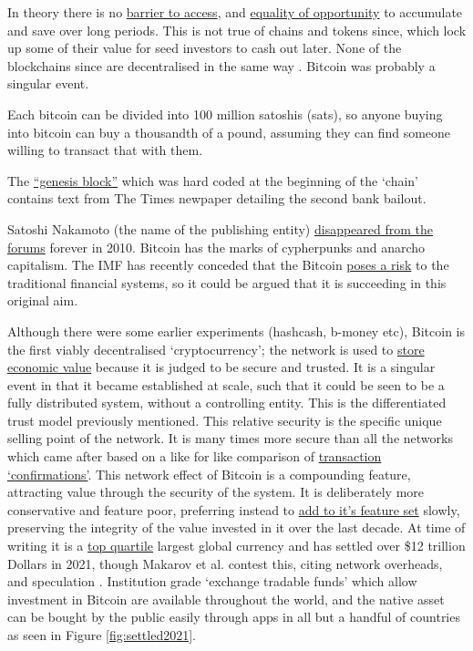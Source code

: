 In theory there is no \href{https://www.forbes.com/sites/peterizzo/2021/09/29/against-cryptocurrency-the-ethical-argument-for-bitcoin-maximalism/?}{barrier to access}, and \href{https://www.coindesk.com/layer2/2022/02/16/why-bitcoin-is-a-tool-for-social-justice/}{equality of opportunity} to accumulate and save over long periods. This is not true of chains and tokens since, which lock up some of their value for seed investors to cash out later. None of the blockchains since are decentralised in the same way \cite{selvam2021blockchain}. Bitcoin was probably a singular event.\par
Each bitcoin can be divided into 100 million satoshis (sats), so anyone buying into bitcoin can buy a thousandth of a pound, assuming they can find someone willing to transact that with them. \par
The \href{https://en.bitcoin.it/wiki/Genesis_block}{``genesis block''} which was hard coded at the beginning of the `chain' contains text from The Times newpaper detailing the second bank bailout.\par 
Satoshi Nakamoto (the name of the publishing entity) \href{https://bitcoinmagazine.com/technical/what-happened-when-bitcoin-creator-satoshi-nakamoto-disappeared}{disappeared from the forums} forever in 2010. Bitcoin has the marks of cypherpunks and anarcho capitalism. The IMF has recently conceded that the Bitcoin \href{https://blogs.imf.org/2022/01/11/crypto-prices-move-more-in-sync-with-stocks-posing-new-risks/}{poses a risk} to the traditional financial systems, so it could be argued that it is succeeding in this original aim.\par
Although there were some earlier experiments (hashcash, b-money etc), Bitcoin is the first viably decentralised `cryptocurrency'; the network is used to \href{https://www.aier.org/article/why-does-bitcoin-have-value/}{store economic value} because it is judged to be secure and trusted. It is a singular event in that it became established at scale, such that it could be seen to be a fully distributed system, without a controlling entity. This is the differentiated trust model previously mentioned. This relative security is the specific unique selling point of the network. It is many times more secure than all the networks which came after based on a like for like comparison of \href{https://howmanyconfs.com/}{transaction `confirmations'}. This network effect of Bitcoin is a compounding feature, attracting value through the security of the system. It is deliberately more conservative and feature poor, preferring instead to \href{https://bips.xyz/}{add to it's feature set} slowly, preserving the integrity of the value invested in it over the last decade. At time of writing it is a \href{https://fiatmarketcap.com/}{top quartile} largest global currency and has settled over \$12 trillion Dollars in 2021, though Makarov et al. contest this, citing network overheads, and speculation \cite{makarov2021blockchain}. Institution grade `exchange tradable funds' which allow investment in Bitcoin are available throughout the world, and the native asset can be bought by the public easily through apps in all but a handful of countries as seen in Figure \ref{fig:settled2021}. \par
